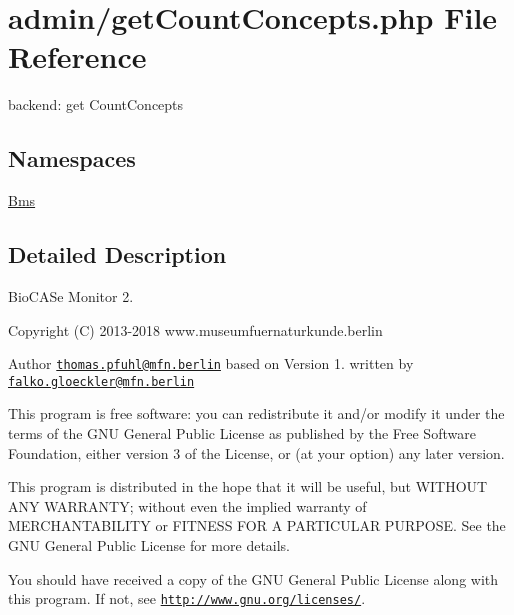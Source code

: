 \hypertarget{get_count_concepts_8php}{}\section{admin/get\+Count\+Concepts.php File Reference}
\label{get_count_concepts_8php}


backend\+: get Count\+Concepts  


\subsection*{Namespaces}
\begin{DoxyCompactItemize}
\item 
 \hyperlink{namespace_bms}{Bms}
\end{DoxyCompactItemize}


\subsection{Detailed Description}
Bio\+C\+A\+Se Monitor 2. \begin{DoxyCopyright}{Copyright}
(C) 2013-\/2018 www.\+museumfuernaturkunde.\+berlin 
\end{DoxyCopyright}
\begin{DoxyAuthor}{Author}
\href{mailto:thomas.pfuhl@mfn.berlin}{\tt thomas.\+pfuhl@mfn.\+berlin} based on Version 1. written by \href{mailto:falko.gloeckler@mfn.berlin}{\tt falko.\+gloeckler@mfn.\+berlin}
\end{DoxyAuthor}
This program is free software\+: you can redistribute it and/or modify it under the terms of the G\+NU General Public License as published by the Free Software Foundation, either version 3 of the License, or (at your option) any later version.

This program is distributed in the hope that it will be useful, but W\+I\+T\+H\+O\+UT A\+NY W\+A\+R\+R\+A\+N\+TY; without even the implied warranty of M\+E\+R\+C\+H\+A\+N\+T\+A\+B\+I\+L\+I\+TY or F\+I\+T\+N\+E\+SS F\+OR A P\+A\+R\+T\+I\+C\+U\+L\+AR P\+U\+R\+P\+O\+SE. See the G\+NU General Public License for more details.

You should have received a copy of the G\+NU General Public License along with this program. If not, see \href{http://www.gnu.org/licenses/}{\tt http\+://www.\+gnu.\+org/licenses/}. 